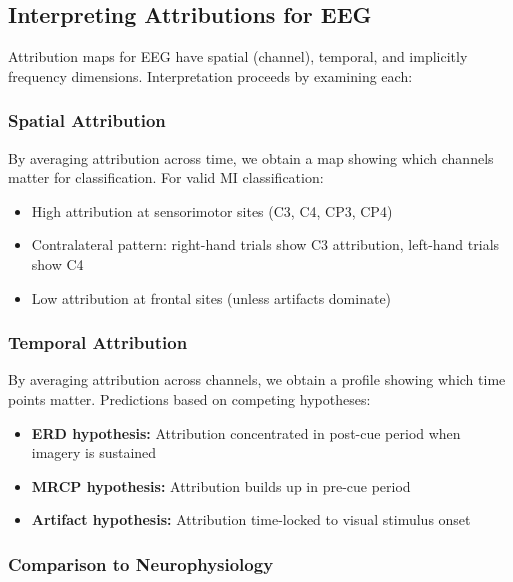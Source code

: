 \subsection{Interpreting Attributions for EEG}
\label{subsec:bg_attribution_eeg}

Attribution maps for EEG have spatial (channel), temporal, and implicitly frequency dimensions. Interpretation proceeds by examining each:

\subsubsection{Spatial Attribution}

By averaging attribution across time, we obtain a map showing which channels matter for classification. For valid MI classification:

\begin{itemize}
    \item High attribution at sensorimotor sites (C3, C4, CP3, CP4)
    \item Contralateral pattern: right-hand trials show C3 attribution, left-hand trials show C4
    \item Low attribution at frontal sites (unless artifacts dominate)
\end{itemize}

\subsubsection{Temporal Attribution}

By averaging attribution across channels, we obtain a profile showing which time points matter. Predictions based on competing hypotheses:

\begin{itemize}
    \item \textbf{ERD hypothesis:} Attribution concentrated in post-cue period when imagery is sustained
    \item \textbf{MRCP hypothesis:} Attribution builds up in pre-cue period
    \item \textbf{Artifact hypothesis:} Attribution time-locked to visual stimulus onset
\end{itemize}

\subsubsection{Comparison to Neurophysiology}

